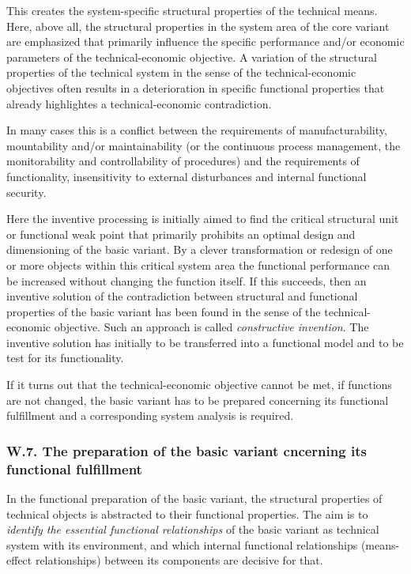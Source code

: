 \documentclass[11pt,a4paper]{article}
\begin{document}
This creates the system-specific structural properties of the technical means.
Here, above all, the structural properties in the system area of the core
variant are emphasized that primarily influence the specific performance
and/or economic parameters of the technical-economic objective.  A variation
of the structural properties of the technical system in the sense of the
technical-economic objectives often results in a deterioration in specific
functional properties that already highlightes a technical-economic
contradiction.

In many cases this is a conflict between the requirements of
manufacturability, mountability and/or maintainability (or the continuous
process management, the monitorability and controllability of procedures) and
the requirements of functionality, insensitivity to external disturbances and
internal functional security.

Here the inventive processing is initially aimed to find the critical
structural unit or functional weak point that primarily prohibits an optimal
design and dimensioning of the basic variant. By a clever transformation or
redesign of one or more objects within this critical system area the
functional performance can be increased without changing the function itself.
If this succeeds, then an inventive solution of the contradiction between
structural and functional properties of the basic variant has been found in
the sense of the technical-economic objective.  Such an approach is called
\emph{constructive invention}. The inventive solution has initially to be
transferred into a functional model and to be test for its functionality.

If it turns out that the technical-economic objective cannot be met, if
functions are not changed, the basic variant has to be prepared concerning its
functional fulfillment and a corresponding system analysis is required.

\subsubsection*{W.7. The preparation of the basic variant cncerning its
  functional fulfillment}

In the functional preparation of the basic variant, the structural properties
of technical objects is abstracted to their functional properties. The aim is
to \emph{identify the essential functional relationships} of the basic variant
as technical system with its environment, and which internal functional
relationships (means-effect relationships) between its components are decisive
for that.
\end{document}
